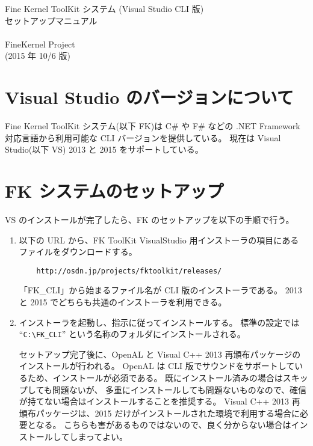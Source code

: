\documentclass[a4j]{jarticle}
\begin{document}
\begin{center}
{\Large Fine Kernel ToolKit システム (Visual Studio CLI 版) \\
	セットアップマニュアル} \\ ~ \\
{\Large FineKernel Project} \\
(2015 年 10/6 版)
\end{center}


\section{Visual Studio のバージョンについて}
Fine Kernel ToolKit システム(以下 FK)は 
C\# や F\# などの .NET Framework 対応言語から利用可能な CLI バージョンを提供している。
現在は Visual Studio(以下 VS) 2013 と 2015 をサポートしている。

\section{FK システムのセットアップ}
VS のインストールが完了したら、FK のセットアップを以下の手順で行う。

\begin{enumerate}
\item 以下の URL から、FK ToolKit VisualStudio 用インストーラの項目にある
ファイルをダウンロードする。

\begin{verbatim}
    http://osdn.jp/projects/fktoolkit/releases/
\end{verbatim}

「FK\_CLI」から始まるファイル名が CLI 版のインストーラである。
2013 と 2015 でどちらも共通のインストーラを利用できる。

\item インストーラを起動し、指示に従ってインストールする。
標準の設定では ``\verb+C:\FK_CLI+'' という名称のフォルダにインストールされる。

セットアップ完了後に、OpenAL と Visual C++ 2013 再頒布パッケージのインストールが行われる。
OpenAL は CLI 版でサウンドをサポートしているため、インストールが必須である。
既にインストール済みの場合はスキップしても問題ないが、
多重にインストールしても問題ないものなので、確信が持てない場合はインストールすることを推奨する。
Visual C++ 2013 再頒布パッケージは、2015 だけがインストールされた環境で利用する場合に必要となる。
こちらも害があるものではないので、良く分からない場合はインストールしてしまってよい。

\end{enumerate}
\end{document}
